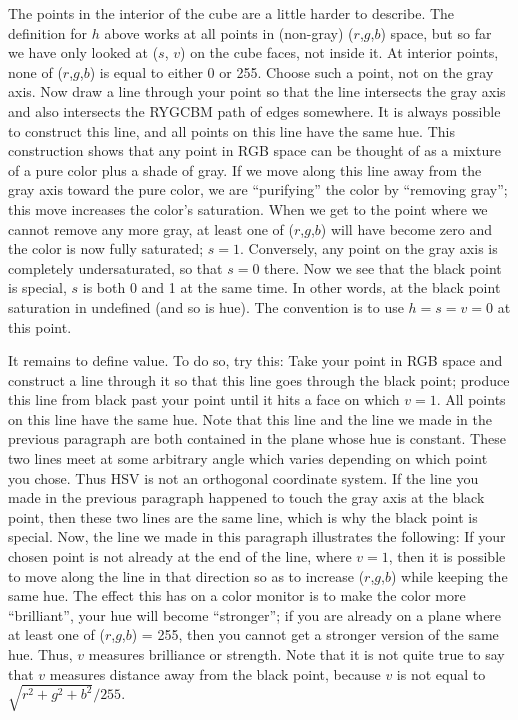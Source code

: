 The points in the interior of the cube are a little harder to describe.
The definition for $h$ above works at all points in (non-gray)
($r$,$g$,$b$) space, but so far we have only looked at ($s$,
$v$) on the cube faces, not inside it.  At interior points, none
of ($r$,$g$,$b$) is equal to either 0 or 255.  Choose such a point,
not on the gray axis.  Now draw a line through your point so that the
line intersects the gray axis and also intersects the RYGCBM path of
edges somewhere.  It is always possible to construct this line, and
all points on this line have the same hue.  This construction shows
that any point in RGB space can be thought of as a mixture of a pure
color plus a shade of gray.  If we move along this line away from the
gray axis toward the pure color, we are ``purifying'' the color by
``removing gray''; this move increases the color's saturation.  When
we get to the point where we cannot remove any more gray, at least one
of ($r$,$g$,$b$) will have become zero and the color is now fully
saturated; $s = 1$.  Conversely, any point on the gray axis is
completely undersaturated, so that $s = 0$ there.  Now we see that
the black point is special, $s$ is both 0 and 1 at the same time. In other words, at the black point saturation in undefined (and so is hue). The convention is to use $h = s = v = 0$ at this point.

It remains to define value. To do so, try this:
Take your point in RGB space and construct a line through it so that
this line goes through the black point; produce this line from black
past your point until it hits a face on which $v = 1$.  All points
on this line have the same hue.  Note that this line and the line we
made in the previous paragraph are both contained in the plane whose
hue is constant.  These two lines meet at some arbitrary
angle which varies depending on which point you chose.  Thus HSV is
not an orthogonal coordinate system.  If the line you made in the
previous paragraph happened to touch the gray axis at the black point,
then these two lines are the same line, which is why the black point
is special.  Now, the line we made in this paragraph illustrates the
following:  If your chosen point is not already at the end of the
line, where $v = 1$, then it is possible to move along the line in
that direction so as to increase ($r$,$g$,$b$) while keeping the
same hue.  The effect this has on a color monitor is to make the
color more ``brilliant'', your hue will become ``stronger''; if you are already on a plane where
at least one of ($r$,$g$,$b$) = 255, then you cannot get a stronger
version of the same hue.  Thus, $v$ measures brilliance or strength.  Note that
it is not quite true to say that $v$ measures distance away from
the black point, because $v$ is not equal to $\sqrt{r^2 + g^2 + b^2}/255$.

